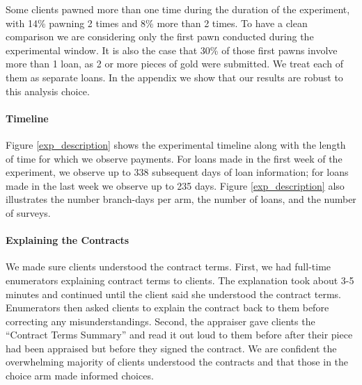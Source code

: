 \documentclass[12pt, a4paper]{article}
\begin{document}
Some clients pawned more than one time during the duration of the experiment, with 14\% pawning 2 times and 8\% more than 2 times. To have a clean comparison we are considering only the first pawn conducted during the experimental window. It is also the case that 30\% of those first pawns involve more than 1 loan, as 2 or more pieces of gold were submitted. We treat each of them as separate loans. In the appendix we show that our results are robust to this analysis choice. 

\paragraph*{Timeline} Figure \ref{exp_description} shows the experimental timeline along with the length of time for which we observe payments. For loans made in the first week of the experiment, we observe up to 338 subsequent days of loan information; for loans made in the last week we observe up to 235 days. Figure \ref{exp_description} also illustrates the number branch-days per arm, the number of loans, and the number of surveys. %

\paragraph*{Explaining the Contracts}
We made sure clients understood the contract terms.  First, we had full-time enumerators explaining contract terms to clients. The explanation took about 3-5 minutes and continued until the client said she understood the contract terms. Enumerators then asked clients to explain the contract back to them before correcting any misunderstandings. Second, the appraiser gave clients the ``Contract Terms Summary'' and read it out loud to them before after their piece had been appraised but before they signed the contract. %
We are confident the overwhelming majority of clients understood the contracts and that those in the choice arm made informed choices.
\end{document}
